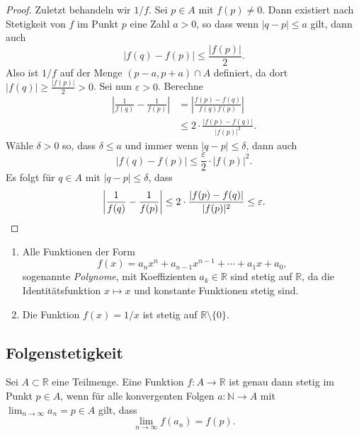 \documentclass[../main.tex]{subfiles}
\begin{document}
\begin{proof}
  Zuletzt behandeln wir $1/f$.
  Sei $p \in A$ mit $f(p) \neq 0$.
  Dann existiert nach Stetigkeit von
  $f$ im Punkt $p$ eine Zahl $a > 0$, so dass
  wenn $|q - p| \leq a$ gilt,
  dann auch
  \[
  |f(q) - f(p)| \leq \frac{|f(p)|}{2}.
  \]
  Also ist $1/f$ auf der Menge $(p-a, p+a) \cap A$ definiert,
  da dort $|f(q)| \geq \frac{|f(p)|}{2} > 0$. %
  Sei nun $\varepsilon > 0$. 
  Berechne
   \begin{align*}
     \left| \frac{1}{f(q)} - \frac{1}{f(p)} \right| 
     & = \left| \frac{f(p) - f(q)}{f(q)f(p)} \right| \\
     & \leq 2 \cdot \frac{|f(p) - f(q)|}{|f(p)|^2}. 
  \end{align*}
  Wähle $\delta > 0$ so, dass $\delta \leq a$ 
  und immer wenn $|q - p| \leq \delta$,
  dann auch 
  \[
    |f(q) - f(p)| \leq \frac{\varepsilon}{2} \cdot |f(p)|^2.
  \]
  Es folgt für $q \in A$ mit $|q - p| \leq \delta$, dass
  \[
    \left| \frac{1}{f(q)}- \frac{1}{f(p)} \right|
    \leq 2 \cdot \frac{|f(p) - f(q)|}{|f(p)|^2} \leq \varepsilon.
    \qedhere
  \]
\end{proof}

\begin{applications}
  \leavevmode
  \begin{enumerate}[(1)]
    \item Alle Funktionen der Form
      \[
        f(x) = a_n x^n + a_{n-1} x^{n-1} + \cdots + a_{1} x + a_0,
      \]
      sogenannte \emph{Polynome},
      mit Koeffizienten $a_k \in \mathbb{R}$ sind stetig
      auf $\mathbb{R}$, da die Identitätsfunktion $x \mapsto x$
      und konstante Funktionen stetig sind.
    \item Die Funktion $f(x) = 1/x$ ist stetig
      auf $\mathbb{R} \setminus \{0\}$.
  \end{enumerate}
\end{applications}

\subsection*{Folgenstetigkeit}
\begin{theorem}
  Sei $A \subset \mathbb{R}$ eine Teilmenge.
  Eine Funktion $f \colon A \to \mathbb{R}$ ist
  genau dann stetig im Punkt
  $p \in A$, wenn für alle
  konvergenten Folgen $a \colon \mathbb{N} \to A$
  mit $\lim_{n \to \infty}a_n = p \in A$ gilt, dass
  \[
    \lim_{n \to \infty} f(a_n) = f(p).
  \]
\end{theorem}
\end{document}
